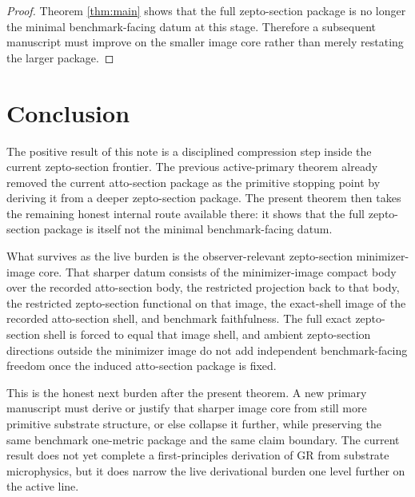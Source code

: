 \documentclass[11pt]{article}
\begin{document}
\begin{proof}
Theorem \ref{thm:main} shows that the full zepto-section package is no longer the minimal benchmark-facing datum at this stage. Therefore a subsequent manuscript must improve on the smaller image core rather than merely restating the larger package.
\end{proof}

\section{Conclusion}

The positive result of this note is a disciplined compression step inside the current zepto-section frontier. The previous active-primary theorem already removed the current atto-section package as the primitive stopping point by deriving it from a deeper zepto-section package. The present theorem then takes the remaining honest internal route available there: it shows that the full zepto-section package is itself not the minimal benchmark-facing datum.

What survives as the live burden is the observer-relevant zepto-section minimizer-image core. That sharper datum consists of the minimizer-image compact body over the recorded atto-section body, the restricted projection back to that body, the restricted zepto-section functional on that image, the exact-shell image of the recorded atto-section shell, and benchmark faithfulness. The full exact zepto-section shell is forced to equal that image shell, and ambient zepto-section directions outside the minimizer image do not add independent benchmark-facing freedom once the induced atto-section package is fixed.

This is the honest next burden after the present theorem. A new primary manuscript must derive or justify that sharper image core from still more primitive substrate structure, or else collapse it further, while preserving the same benchmark one-metric package and the same claim boundary. The current result does not yet complete a first-principles derivation of GR from substrate microphysics, but it does narrow the live derivational burden one level further on the active line.
\end{document}
